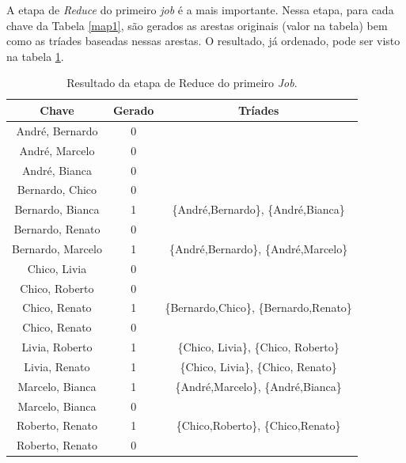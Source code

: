 A etapa de \textit{Reduce} do primeiro \textit{job} é a mais importante. Nessa etapa, para cada chave 
da Tabela \ref{map1}, são gerados as arestas originais (valor na tabela) bem como as tríades baseadas 
nessas arestas. O resultado, já ordenado, pode ser visto na tabela \ref{reduce1}.

\begin{table}[!htbp]
\centering
\caption{Resultado da etapa de Reduce do primeiro \textit{Job}.}
\label{reduce1}
\begin{tabular}{|c|c|c|}
\hline
{\bf Chave}       & {\bf Gerado} & {\bf Tríades}                           \\ \hline
André, Bernardo   & 0            &                                         \\ \hline
André, Marcelo    & 0            &                                         \\ \hline
André, Bianca     & 0            &                                         \\ \hline
Bernardo, Chico   & 0            &                                         \\ \hline
Bernardo, Bianca  & 1            & \{André,Bernardo\}, \{André,Bianca\}    \\ \hline
Bernardo, Renato  & 0            &                                         \\ \hline
Bernardo, Marcelo & 1            & \{André,Bernardo\}, \{André,Marcelo\}   \\ \hline
Chico, Livia      & 0            &                                         \\ \hline
Chico, Roberto    & 0            &                                         \\ \hline
Chico, Renato     & 1            & \{Bernardo,Chico\}, \{Bernardo,Renato\} \\ \hline
Chico, Renato     & 0            &                                         \\ \hline
Livia, Roberto    & 1            & \{Chico, Livia\}, \{Chico, Roberto\}    \\ \hline
Livia, Renato     & 1            & \{Chico, Livia\}, \{Chico, Renato\}     \\ \hline
Marcelo, Bianca   & 1            & \{André,Marcelo\}, \{André,Bianca\}     \\ \hline
Marcelo, Bianca   & 0            &                                         \\ \hline
Roberto, Renato   & 1            & \{Chico,Roberto\}, \{Chico,Renato\}     \\ \hline
Roberto, Renato   & 0            &                                         \\ \hline
\end{tabular}
\end{table}


